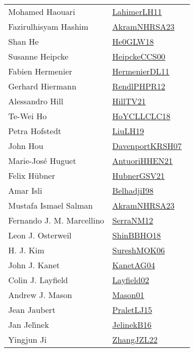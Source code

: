 {\begin{longtable}{p{4cm}p{20cm}}
Mohamed Haouari & \href{works/LahimerLH11.pdf}{LahimerLH11}~\cite{LahimerLH11}\\
Fazirulhisyam Hashim & \href{works/AkramNHRSA23.pdf}{AkramNHRSA23}~\cite{AkramNHRSA23}\\
Shan He & \href{works/He0GLW18.pdf}{He0GLW18}~\cite{He0GLW18}\\
Susanne Heipcke & \href{works/HeipckeCCS00.pdf}{HeipckeCCS00}~\cite{HeipckeCCS00}\\
Fabien Hermenier & \href{works/HermenierDL11.pdf}{HermenierDL11}~\cite{HermenierDL11}\\
Gerhard Hiermann & \href{works/RendlPHPR12.pdf}{RendlPHPR12}~\cite{RendlPHPR12}\\
Alessandro Hill & \href{works/HillTV21.pdf}{HillTV21}~\cite{HillTV21}\\
Te{-}Wei Ho & \href{works/HoYCLLCLC18.pdf}{HoYCLLCLC18}~\cite{HoYCLLCLC18}\\
Petra Hofstedt & \href{works/LiuLH19.pdf}{LiuLH19}~\cite{LiuLH19}\\
John Hou & \href{works/DavenportKRSH07.pdf}{DavenportKRSH07}~\cite{DavenportKRSH07}\\
Marie{-}Jos{\'{e}} Huguet & \href{works/AntuoriHHEN21.pdf}{AntuoriHHEN21}~\cite{AntuoriHHEN21}\\
Felix H{\"{u}}bner & \href{works/HubnerGSV21.pdf}{HubnerGSV21}~\cite{HubnerGSV21}\\
Amar Isli & \href{works/BelhadjiI98.pdf}{BelhadjiI98}~\cite{BelhadjiI98}\\
Mustafa Ismael Salman & \href{works/AkramNHRSA23.pdf}{AkramNHRSA23}~\cite{AkramNHRSA23}\\
Fernando J. M. Marcellino & \href{works/SerraNM12.pdf}{SerraNM12}~\cite{SerraNM12}\\
Leon J. Osterweil & \href{works/ShinBBHO18.pdf}{ShinBBHO18}~\cite{ShinBBHO18}\\
H. J. Kim & \href{works/SureshMOK06.pdf}{SureshMOK06}~\cite{SureshMOK06}\\
John J. Kanet & \href{}{KanetAG04}~\cite{KanetAG04}\\
Colin J. Layfield & \href{}{Layfield02}~\cite{Layfield02}\\
Andrew J. Mason & \href{works/Mason01.pdf}{Mason01}~\cite{Mason01}\\
Jean Jaubert & \href{works/PraletLJ15.pdf}{PraletLJ15}~\cite{PraletLJ15}\\
Jan Jel{\'{\i}}nek & \href{works/JelinekB16.pdf}{JelinekB16}~\cite{JelinekB16}\\
Yingjun Ji & \href{works/ZhangJZL22.pdf}{ZhangJZL22}~\cite{ZhangJZL22}\\

\end{longtable}}
